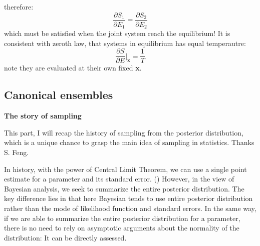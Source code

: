 \documentclass{article}
\begin{document}
therefore:
\begin{equation}
	\frac{\partial S_1}{\partial E_1} = \frac{\partial S_2}{\partial E_2}
\end{equation}
which must be satisfied when the joint system reach the equilibrium! It is consistent with zeroth law, that systems in equilibrium has equal temperautre:
\begin{equation}
	\frac{\partial S}{\partial E}\Big|_{\textbf{x}} = \frac{1}{T}
\end{equation}
note they are evaluated at their own fixed  \textbf{x}.



\subsection*{Canonical ensembles}

\clearpage
\begin{center}
\textbf{\Large The story of sampling}
\end{center}
This part, I will recap the history of sampling from the posterior distribution, which is a unique chance to grasp the main idea of sampling in statistics. Thanks S. Feng.

In history, with the power of Central Limit Theorem, we can use a single point estimate for a parameter and its standard error. () However, in the view of Bayesian analysis, we seek to summarize the entire posterior distribution. The key difference lies in that here Bayesian tends to use entire posterior distribution rather than the mode of likelihood function and standard errors. In the same way, if we are able to summarize the entire posterior distribution for a parameter, there is no need to rely on asymptotic arguments about the normality of the distribution: It can be directly assessed. 
\end{document}
